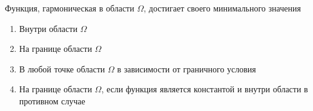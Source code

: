 Функция, гармоническая в области \(\Omega\), достигает своего минимального значения

\begin{enumerate}[label=\arabic*)]
    \item Внутри области \(\Omega\)
    \item На границе области \(\Omega\)
    \item В любой точке области \(\Omega\) в зависимости от граничного условия
    \item На границе области \(\Omega\), если функция является константой и внутри области в противном случае
\end{enumerate}

